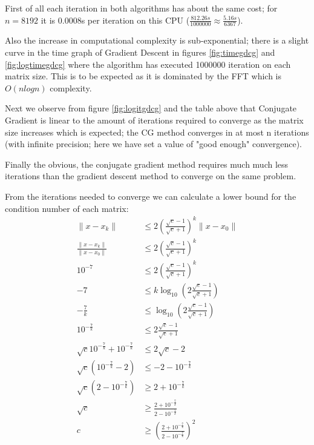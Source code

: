 \documentclass[a4paper]{article}
\begin{document}
First of all each iteration in both algorithms has about the same cost; for $n=8192$ it is 0.0008s per iteration on this CPU ($\frac{812.26s}{1000000} \approx \frac{5.16s}{6367}$).

Also the increase in computational complexity is sub-exponential; there is a slight curve in the time graph of Gradient Descent in figures \ref{fig:timegdcg}  and \ref{fig:logtimegdcg} where the algorithm has executed 1000000 iteration on each matrix size. This is to be expected as it is dominated by the FFT which is $O(nlogn)$ complexity.

Next we observe from figure \ref{fig:logitgdcg} and the table above that Conjugate Gradient is linear to the amount of iterations required to converge as the matrix size increases which is expected; the CG method converges in at most n iterations (with infinite precision; here we have set a value of "good enough" convergence).

Finally the obvious, the conjugate gradient method requires much much less iterations than the gradient descent method to converge on the same problem.

From the iterations needed to converge we can calculate a lower bound for the condition number of each matrix:
\begin{align}
\|x - x_k\| &\le 2(\frac{\sqrt{c} - 1}{\sqrt{c} + 1})^k\|x - x_0\|\nonumber\\
\frac{\|x - x_k\|}{\|x - x_0\|} &\le 2(\frac{\sqrt{c} - 1}{\sqrt{c} + 1})^k\nonumber\\
10^{-7} &\le 2(\frac{\sqrt{c} - 1}{\sqrt{c} + 1})^k\nonumber\\
-7 &\le k\log_{10}(2\frac{\sqrt{c} - 1}{\sqrt{c} + 1})\nonumber\\
-\frac{7}{k} &\le \log_{10}(2\frac{\sqrt{c} - 1}{\sqrt{c} + 1})\nonumber\\
10^{-\frac{7}{k}} &\le 2\frac{\sqrt{c} - 1}{\sqrt{c} + 1}\nonumber\\
\sqrt{c}10^{-\frac{7}{k}} + 10^{-\frac{7}{k}} &\le 2\sqrt{c}-2\nonumber\\
\sqrt{c}(10^{-\frac{7}{k}}-2) &\le -2 - 10^{-\frac{7}{k}}\nonumber\\
\sqrt{c}(2 - 10^{-\frac{7}{k}}) &\ge 2 + 10^{-\frac{7}{k}}\nonumber\\
\sqrt{c} &\ge \frac{2 + 10^{-\frac{7}{k}}}{2 - 10^{-\frac{7}{k}}}\nonumber\\
c &\ge (\frac{2 + 10^{-\frac{7}{k}}}{2 - 10^{-\frac{7}{k}}})^2\nonumber\\
\end{align}
\end{document}
